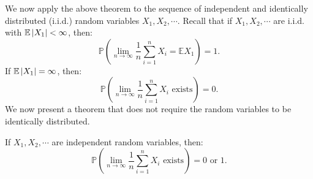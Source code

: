 \documentclass{huhtakm-template-book-v2}
\newcommand{\prob}{\mathbb{P}}
\newcommand{\expect}{\mathbb{E}}
\begin{document}
    We now apply the above theorem to the sequence of independent and identically distributed (i.i.d.) random variables $X_{1},X_{2},\cdots$. Recall that if $X_{1},X_{2},\cdots$ are i.i.d. with $\expect\abs{X_{1}} < \infty$, then:
    \begin{equation*}
        \prob\left(\lim_{n \to \infty}\frac{1}{n}\sum_{i = 1}^{n}X_{i} = \expect{X_{1}}\right) = 1.
    \end{equation*}
    If $\expect\abs{X_{1}} = \infty$, then:
    \begin{equation*}
        \prob\left(\lim_{n \to \infty}\frac{1}{n}\sum_{i = 1}^{n}X_{i}\text{ exists}\right) = 0.
    \end{equation*}
    We now present a theorem that does not require the random variables to be identically distributed.
    \begin{thm}
        If $X_{1},X_{2},\cdots$ are independent random variables, then:
        \begin{equation*}
            \prob\left(\lim_{n \to \infty}\frac{1}{n}\sum_{i = 1}^{n}X_{i}\text{ exists}\right) = 0\text{ or }1.
        \end{equation*}
    \end{thm}
\end{document}
